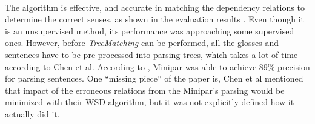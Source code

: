 \documentclass[12 pt]{article}
\begin{document}
\paragraph{}
The algorithm is effective, and accurate in matching the dependency relations to determine the correct senses, as shown in the evaluation results \cite{unsupervised}. Even though it is an unsupervised method, its performance was approaching some supervised ones. However, before \textit{TreeMatching} can be performed, all the glosses and sentences have to be pre-processed into parsing trees, which takes a lot of time according to Chen et al. According to \cite{minipar}, Minipar was able to achieve 89\% precision for parsing sentences. One ``missing piece'' of the paper is, Chen et al mentioned that impact of the erroneous relations from the Minipar's parsing would be minimized with their WSD algorithm, but it was not explicitly defined how it actually did it.
%
\end{document}
